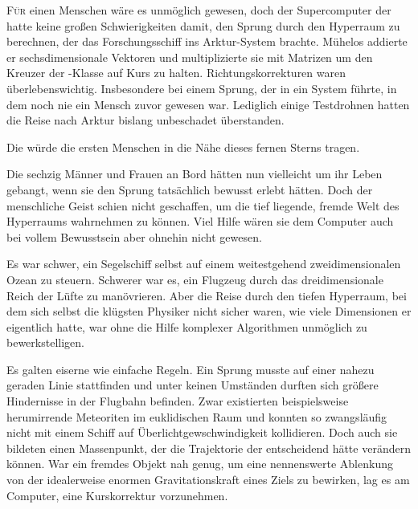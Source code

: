 \lettrine[lines=3]{F}{\"ur} einen Menschen wäre es unmöglich gewesen, doch der Supercomputer der  hatte keine großen Schwierigkeiten damit, den Sprung durch den Hyperraum zu berechnen, der das Forschungsschiff ins Arktur-System brachte. Mühelos addierte er sechsdimensionale Vektoren und multiplizierte sie mit Matrizen um den Kreuzer der -Klasse auf Kurs zu halten. Richtungskorrekturen waren überlebenswichtig. Insbesondere bei einem Sprung, der in ein System führte, in dem noch nie ein Mensch zuvor gewesen war. Lediglich einige Testdrohnen hatten die Reise nach Arktur bislang unbeschadet überstanden.

\par

Die  würde die ersten Menschen in die Nähe dieses fernen Sterns tragen.

\par

Die sechzig Männer und Frauen an Bord hätten nun vielleicht um ihr Leben gebangt, wenn sie den Sprung tatsächlich bewusst erlebt hätten. Doch der menschliche Geist schien nicht geschaffen, um die tief liegende, fremde Welt des Hyperraums wahrnehmen zu können. Viel Hilfe wären sie dem Computer auch bei vollem Bewusstsein aber ohnehin nicht gewesen.

\par

Es war schwer, ein Segelschiff selbst auf einem weitestgehend zweidimensionalen Ozean zu steuern. Schwerer war es, ein Flugzeug durch das dreidimensionale Reich der Lüfte zu manövrieren. Aber die Reise durch den tiefen Hyperraum, bei dem sich selbst die klügsten Physiker nicht sicher waren, wie viele Dimensionen er eigentlich hatte, war ohne die Hilfe komplexer Algorithmen unmöglich zu bewerkstelligen.

\par

Es galten eiserne wie einfache Regeln. Ein Sprung musste auf einer nahezu geraden Linie stattfinden und unter keinen Umständen durften sich größere Hindernisse in der Flugbahn befinden. Zwar existierten beispielsweise herumirrende Meteoriten im euklidischen Raum und konnten so zwangsläufig nicht mit einem Schiff auf Überlichtgewschwindigkeit kollidieren. Doch auch sie bildeten einen Massenpunkt, der die Trajektorie der  entscheidend hätte verändern können. War ein fremdes Objekt nah genug, um eine nennenswerte Ablenkung von der idealerweise enormen Gravitationskraft eines Ziels zu bewirken, lag es am Computer, eine Kurskorrektur vorzunehmen.

